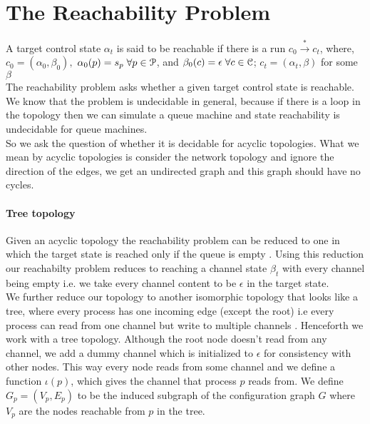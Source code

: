 \documentclass[a4paper,UKenglish,cleveref, autoref, thm-restate]{lipics-v2019}
\begin{document}
\section{The Reachability Problem}
\hspace*{0.5cm}A target control state $\alpha_t$ is said to be reachable if there is a run $c_0 \xrightarrow{*} c_t$, where, $c_0 = (\alpha_0, \beta_0),$  $\alpha_0(p)= s_p \hspace{1mm}\forall p \in \mathcal{P}$, and $\beta_0(c) = \epsilon \hspace{1mm} \forall c \in \mathcal{C}$; $c_t = (\alpha_t, \beta)$ for some $\beta$ \\
\hspace*{0.5cm}The reachability problem asks whether a given target control state is reachable. We know that the problem is undecidable in general, because if there is a loop in the topology then we can simulate a queue machine and state reachability is undecidable for queue machines. \\
\hspace*{0.5cm}So we ask the question of whether it is decidable for acyclic topologies.
What we mean by acyclic topologies is consider the network topology and ignore the direction of the edges, we get an undirected graph and this graph should have no cycles. 

\paragraph*{Tree topology}

\hspace*{0.5cm}Given an acyclic topology the reachability problem can be reduced to one in which the target state is reached only if the queue is empty \cite{CQS}. Using this reduction our reachabilty problem reduces to reaching a channel state $\beta_t$ with every channel being empty i.e. we take every channel content to be $\epsilon$ in the target state.\\
\hspace*{0.5cm}We further reduce our topology to another isomorphic topology that looks like a tree, where every process has one incoming edge (except the root) i.e every process can read from one channel but write to multiple channels \cite{CQS}. Henceforth we work with a tree topology. Although the root node doesn't read from any channel, we add a dummy channel which is initialized to $\epsilon$ for consistency with other nodes. This way every node reads from some channel and we define a function $\iota(p)$, which gives the channel that process $p$ reads from. We define $G_p = (V_p, E_p)$ to be the induced subgraph of the configuration graph $G$ where $V_p$ are the nodes reachable from $p$ in the tree. 
\end{document}
